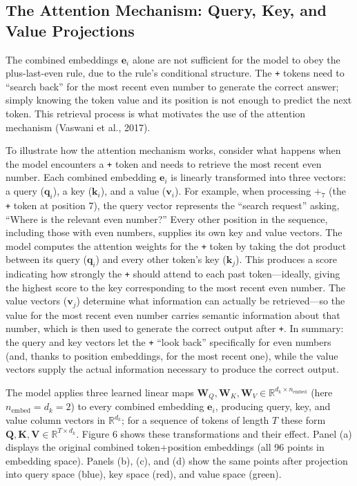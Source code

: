 \documentclass[
  11pt,
  a4paper,
]{article}
\begin{document}
\subsection{The Attention Mechanism: Query, Key, and Value Projections}\label{the-attention-mechanism-query-key-and-value-projections}

The combined embeddings \(\mathbf{e}_i\) alone are not sufficient for
the model to obey the plus-last-even rule, due to the rule's conditional
structure. The \texttt{+} tokens need to ``search back'' for the most
recent even number to generate the correct answer; simply knowing the
token value and its position is not enough to predict the next token.
This retrieval process is what motivates the use of the attention
mechanism (Vaswani et al., 2017).

To illustrate how the attention mechanism works, consider what happens
when the model encounters a \texttt{+} token and needs to retrieve the
most recent even number. Each combined embedding \(\mathbf{e}_i\) is
linearly transformed into three vectors: a query (\(\mathbf{q}_i\)), a
key (\(\mathbf{k}_i\)), and a value (\(\mathbf{v}_i\)). For example,
when processing \(+_7\) (the \texttt{+} token at position 7), the query
vector represents the ``search request'' asking, ``Where is the relevant
even number?'' Every other position in the sequence, including those
with even numbers, supplies its own key and value vectors. The model
computes the attention weights for the \texttt{+} token by taking the
dot product between its query (\(\mathbf{q}_i\)) and every other token's
key (\(\mathbf{k}_j\)). This produces a score indicating how strongly
the \texttt{+} should attend to each past token---ideally, giving the
highest score to the key corresponding to the most recent even number.
The value vectors (\(\mathbf{v}_j\)) determine what information can
actually be retrieved---so the value for the most recent even number
carries semantic information about that number, which is then used to
generate the correct output after \texttt{+}. In summary: the query and
key vectors let the \texttt{+} ``look back'' specifically for even
numbers (and, thanks to position embeddings, for the most recent one),
while the value vectors supply the actual information necessary to
produce the correct output.

The model applies three learned linear maps
\(\mathbf{W}_Q, \mathbf{W}_K, \mathbf{W}_V \in \mathbb{R}^{d_k \times n_{\mathrm{embed}}}\)
(here \(n_{\mathrm{embed}} = d_k = 2\)) to every combined embedding
\(\mathbf{e}_i\), producing query, key, and value column vectors in
\(\mathbb{R}^{d_k}\); for a sequence of tokens of length \(T\) these
form
\(\mathbf{Q}, \mathbf{K}, \mathbf{V} \in \mathbb{R}^{T \times d_k}\).
Figure 6 shows these transformations and their effect. Panel (a)
displays the original combined token+position embeddings (all 96 points
in embedding space). Panels (b), (c), and (d) show the same points after
projection into query space (blue), key space (red), and value space
(green).
\end{document}
